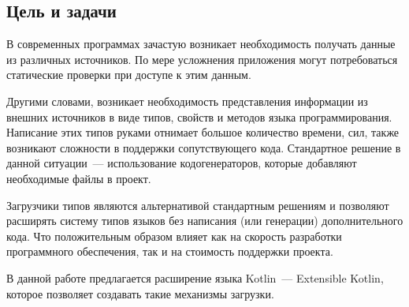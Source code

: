 \subsection{Цель и задачи}

В современных программах зачастую возникает необходимость получать данные из различных источников.
По мере усложнения приложения могут потребоваться статические проверки при доступе к этим данным.

Другими словами, возникает необходимость представления информации из внешних источников в виде типов, свойств и методов языка программирования.
Написание этих типов руками отнимает большое количество времени, сил, также возникают сложности в поддержки сопутствующего кода.
Стандартное решение в данной ситуации~--- использование кодогенераторов, которые добавляют необходимые файлы в проект.

Загрузчики типов являются альтернативой стандартным решениям и позволяют расширять систему типов языков без написания (или генерации) дополнительного кода.
Что положительным образом влияет как на скорость разработки программного обеспечения, так и на стоимость поддержки проекта.

В данной работе предлагается расширение языка Kotlin~--- Extensible Kotlin, которое позволяет создавать такие механизмы загрузки.
